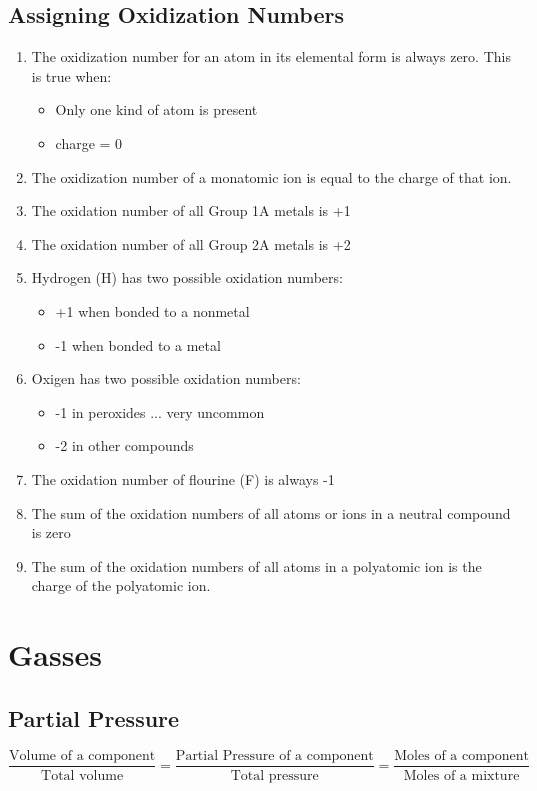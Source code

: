 \documentclass[]{article}
\begin{document}
\subsection{Assigning Oxidization Numbers}
\begin{enumerate}
\item The oxidization number for an atom in its elemental form is always zero. This is true when:
	\begin{itemize}
	\item Only one kind of atom is present
	\item charge = 0
	\end{itemize}
\item The oxidization number of a monatomic ion is equal to the charge of that ion.
\item The oxidation number of all Group 1A metals is +1
\item The oxidation number of all Group 2A metals is +2
\item Hydrogen (H) has two possible oxidation numbers:
	\begin{itemize}
	\item +1 when bonded to a nonmetal
	\item -1 when bonded to a metal
	\end{itemize}
\item Oxigen has two possible oxidation numbers:
	\begin{itemize}
	\item -1 in peroxides ... very uncommon
	\item -2 in other compounds

	\end{itemize}
\item The oxidation number of flourine (F) is always -1
\item The sum of the oxidation numbers of all atoms or ions in a neutral compound is zero
\item The sum of the oxidation numbers of all atoms in a polyatomic ion is the charge of the polyatomic ion.
\end{enumerate}
\section{Gasses}
\subsection{Partial Pressure}
\[
	\frac{\text{Volume of a component}}{\text{Total volume}}
	=
	\frac{\text{Partial Pressure of a component}}{\text{Total pressure}}
	=
	\frac{\text{Moles of a component}}{\text{Moles of a mixture}}
\]
\end{document}
